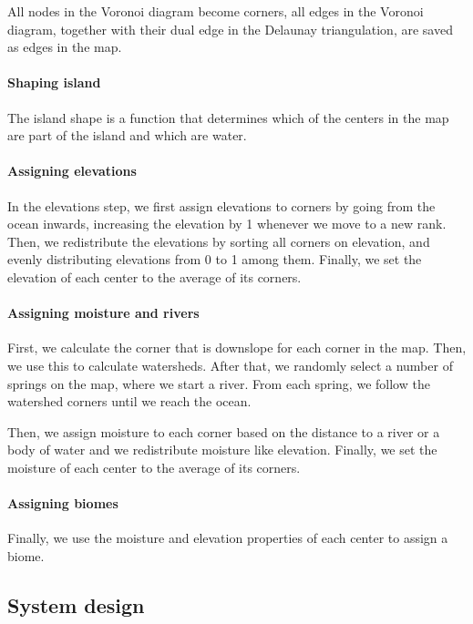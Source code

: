 All nodes in the Voronoi diagram become corners, all edges in the Voronoi diagram, together with their dual edge in the Delaunay triangulation, are saved as edges in the map.

\paragraph{Shaping island}

The island shape is a function that determines which of the centers in the map are part of the island and which are water.

\paragraph{Assigning elevations}

In the elevations step, we first assign elevations to corners by going from the ocean inwards, increasing the elevation by 1 whenever we move to a new rank.
Then, we redistribute the elevations by sorting all corners on elevation, and evenly distributing elevations from 0 to 1 among them.
Finally, we set the elevation of each center to the average of its corners.

\paragraph{Assigning moisture and rivers}

First, we calculate the corner that is downslope for each corner in the map.
Then, we use this to calculate watersheds.
After that, we randomly select a number of springs on the map, where we start a river.
From each spring, we follow the watershed corners until we reach the ocean.

Then, we assign moisture to each corner based on the distance to a river or a body of water and we redistribute moisture like elevation.
Finally, we set the moisture of each center to the average of its corners.

\paragraph{Assigning biomes}

Finally, we use the moisture and elevation properties of each center to assign a biome.

\subsection{System design}

